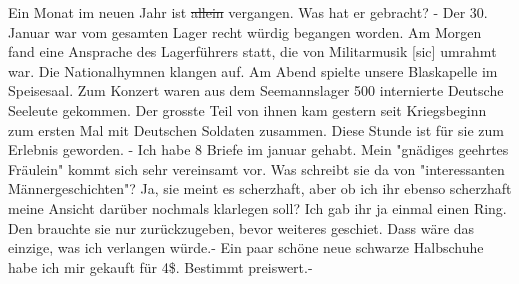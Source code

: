 \def\day{31. 1. 1944.}
\mktitle

Ein Monat im neuen Jahr ist \st{allein} vergangen.
Was hat er gebracht?
- Der 30. Januar war vom gesamten Lager recht w\"{u}rdig begangen worden.
Am Morgen fand eine Ansprache des Lagerf\"{u}hrers statt, die von Militarmusik{\color{red} [sic] } umrahmt war.
Die Nationalhymnen klangen auf.
Am Abend spielte unsere Blaskapelle im Speisesaal.
Zum Konzert waren aus dem Seemannslager 500 internierte Deutsche Seeleute gekommen.
Der grosste Teil von ihnen kam gestern seit Kriegsbeginn zum ersten Mal mit Deutschen Soldaten zusammen.
Diese Stunde ist f\"{u}r sie zum Erlebnis geworden.
- Ich habe 8 Briefe im januar gehabt.
Mein "gn\"{a}diges geehrtes Fr\"{a}ulein" kommt sich sehr vereinsamt vor.
Was schreibt sie da von "interessanten M\"{a}nnergeschichten"?
Ja, sie meint es scherzhaft, aber ob ich ihr ebenso scherzhaft meine Ansicht dar\"{u}ber nochmals klarlegen soll?
Ich gab ihr ja einmal einen Ring.
Den brauchte sie nur zur\"{u}ckzugeben, bevor weiteres geschiet.
Dass w\"{a}re das einzige, was ich verlangen w\"{u}rde.-
Ein paar sch\"{o}ne neue schwarze Halbschuhe habe ich mir gekauft f\"{u}r 4{\$}.
Bestimmt preiswert.-

\clearpage
